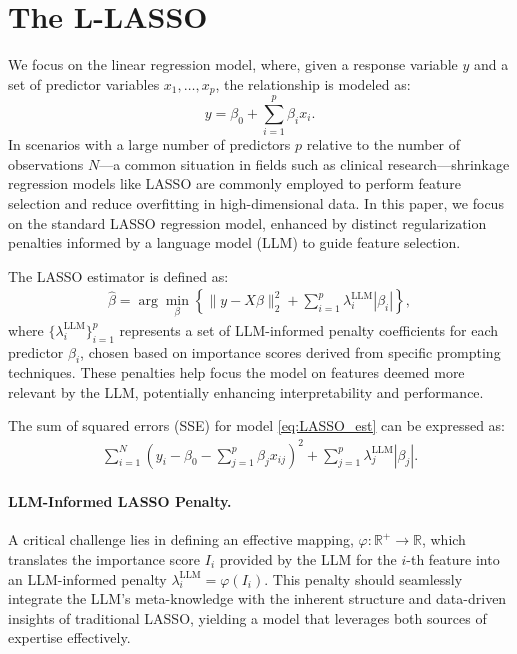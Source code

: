 \section{The L-LASSO}
We focus on the linear regression model, where, given a response variable \( y \) and a set of predictor variables \( x_1, \ldots, x_p \), the relationship is modeled as: 
\[
y = \beta_0 + \sum_{i=1}^{p} \beta_i x_i.
\]
In scenarios with a large number of predictors \( p \) relative to the number of observations \( N \)—a common situation in fields such as clinical research—shrinkage regression models like LASSO are commonly employed to perform feature selection and reduce overfitting in high-dimensional data. In this paper, we focus on the standard LASSO regression model, enhanced by distinct regularization penalties informed by a language model (LLM) to guide feature selection.

The LASSO estimator is defined as:
\begin{align}\label{eq:LASSO_est}
    \hat{\beta} = \arg\min_{\beta} \left\{ \|y - X \beta\|^2_2 + \sum_{i=1}^{p} \lambda^{\text{LLM}}_i |\beta_i| \right\},
\end{align}
where \( \{\lambda^{\text{LLM}}_i\}_{i=1}^{p} \) represents a set of LLM-informed penalty coefficients for each predictor \( \beta_i \), chosen based on importance scores derived from specific prompting techniques. These penalties help focus the model on features deemed more relevant by the LLM, potentially enhancing interpretability and performance.

The sum of squared errors (SSE) for model \eqref{eq:LASSO_est} can be expressed as:
\begin{align}\label{eq:LASSO_sse}
    \sum_{i=1}^{N} \left( y_i - \beta_0 - \sum_{j=1}^{p} \beta_j x_{ij} \right)^2 + \sum_{j=1}^{p} \lambda^{\text{LLM}}_j |\beta_j|.
\end{align}
\paragraph{LLM-Informed LASSO Penalty.} A critical challenge lies in defining an effective mapping, $\varphi : \mathbb{R}^{+} \rightarrow \mathbb{R}$, which translates the importance score $I_i$ provided by the LLM for the $i$-th feature into an LLM-informed penalty $\lambda^{\text{LLM}}_i = \varphi(I_i)$. This penalty should seamlessly integrate the LLM’s meta-knowledge with the inherent structure and data-driven insights of traditional LASSO, yielding a model that leverages both sources of expertise effectively.

